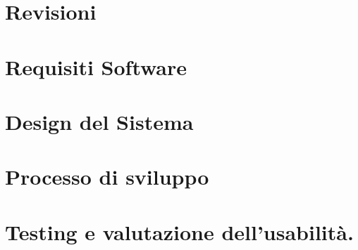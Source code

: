 \documentclass[a4paper,12pt]{report}
\begin{document}
\tableofcontents %



\chapter{Revisioni}


\chapter{Requisiti Software}


\chapter{Design del Sistema}




\chapter{Processo di sviluppo}


\chapter{Testing e valutazione dell’usabilità.}



\end{document}
